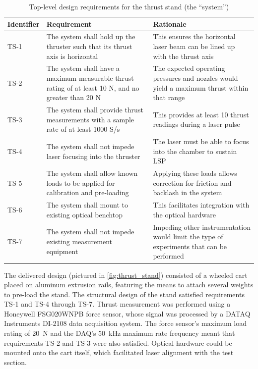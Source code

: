             \begin{table}[h]
                \renewcommand{\arraystretch}{1.3}
                \centering
                \caption[Top-level design requirements for the thrust stand]{Top-level design requirements for the thrust stand (the ``system'')}
                \label{tab:tsReq}
                \begin{tabular}{l>{\raggedright}p{}p{}<{\raggedright}}
                    \toprule
                    Identifier  & Requirement   & Rationale \\
                    \midrule
                    TS-1 &  The system shall hold up the thruster such that its thrust axis is horizontal & This ensures the horizontal laser beam can be lined up with the thrust axis \\
                    TS-2 &  The system shall have a maximum measurable thrust rating of at least 10 N, and no greater than 20 N &  The expected operating pressures and nozzles would yield a maximum thrust within that range\\
                    TS-3 &  The system shall provide thrust measurements with a sample rate of at least 1000 S/s & This provides at least 10 thrust readings during a laser pulse \\
                    TS-4 &  The system shall not impede laser focusing into the thruster & The laser must be able to focus into the chamber to sustain LSP \\
                    TS-5 &  The system shall allow known loads to be applied for calibration and pre-loading & Applying these loads allows correction for friction and backlash in the system \\
                    TS-6 &  The system shall mount to existing optical benchtop & This facilitates integration with the optical hardware \\
                    TS-7 &  The system shall not impede existing measurement equipment & Impeding other instrumentation would limit the type of experiments that can be performed \\
                    \bottomrule
                \end{tabular}
            \end{table}

            The delivered design (pictured in \autoref{fig:thrust_stand}) consisted of a wheeled cart placed on aluminum extrusion rails, featuring the means to attach several weights to pre-load the stand. The structural design of the stand satisfied requirements TS-1 and TS-4 through TS-7. Thrust measurement was performed using a Honeywell FSG020WNPB force sensor, whose signal was processed by a DATAQ Instruments DI-2108 data acquisition system. The force sensor's maximum load rating of \qty{20}{N} and the DAQ's \qty{50}{kHz} maximum rate frequency meant that requirements TS-2 and TS-3 were also satisfied. Optical hardware could be mounted onto the cart itself, which facilitated laser alignment with the test section.

